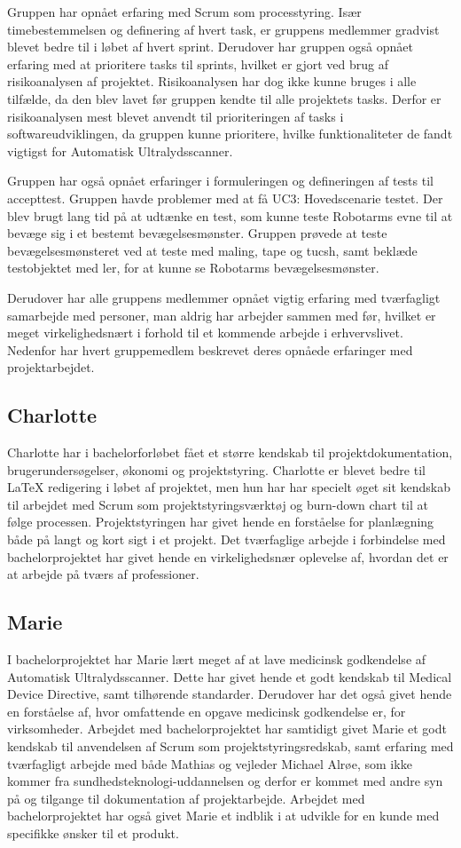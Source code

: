 Gruppen har opnået erfaring med Scrum som processtyring. Især timebestemmelsen og definering af hvert task, er gruppens medlemmer gradvist blevet bedre til i løbet af hvert sprint. Derudover har gruppen også opnået erfaring med at prioritere tasks til sprints, hvilket er gjort ved brug af risikoanalysen af projektet. Risikoanalysen har dog ikke kunne bruges i alle tilfælde, da den blev lavet før gruppen kendte til alle projektets tasks. Derfor er risikoanalysen mest blevet anvendt til prioriteringen af tasks i softwareudviklingen, da gruppen kunne prioritere, hvilke funktionaliteter de fandt vigtigst for Automatisk Ultralydsscanner. 

Gruppen har også opnået erfaringer i formuleringen og defineringen af tests til accepttest. Gruppen havde problemer med at få UC3: Hovedscenarie testet. Der blev brugt lang tid på at udtænke en test, som kunne teste Robotarms evne til at bevæge sig i et bestemt bevægelsesmønster. Gruppen prøvede at teste bevægelsesmønsteret ved at teste med maling, tape og tucsh, samt beklæde testobjektet med ler, for at kunne se Robotarms bevægelsesmønster. 

Derudover har alle gruppens medlemmer opnået vigtig erfaring med tværfagligt samarbejde med personer, man aldrig har arbejder sammen med før, hvilket er meget virkelighedsnært i forhold til et kommende arbejde i erhvervslivet.
Nedenfor har hvert gruppemedlem beskrevet deres opnåede erfaringer med projektarbejdet. 

\subsection{Charlotte}
Charlotte har i bachelorforløbet fået et større kendskab til projektdokumentation, brugerundersøgelser, økonomi og projektstyring. Charlotte er blevet bedre til LaTeX redigering i løbet af projektet, men hun har har specielt øget sit kendskab til arbejdet med Scrum som projektstyringsværktøj og burn-down chart til at følge processen. Projektstyringen har givet hende en forståelse for planlægning både på langt og kort sigt i et projekt. Det tværfaglige arbejde i forbindelse med bachelorprojektet har givet hende en virkelighedsnær oplevelse af, hvordan det er at arbejde på tværs af professioner. 

\subsection{Marie}
I bachelorprojektet har Marie lært meget af at lave medicinsk godkendelse af Automatisk Ultralydsscanner. Dette har givet hende et godt kendskab til Medical Device Directive, samt tilhørende standarder. Derudover har det også givet hende en forståelse af, hvor omfattende en opgave medicinsk godkendelse er, for virksomheder. Arbejdet med bachelorprojektet har samtidigt givet Marie et godt kendskab til anvendelsen af Scrum som projektstyringsredskab, samt erfaring med tværfagligt arbejde med både Mathias og vejleder Michael Alrøe, som ikke kommer fra sundhedsteknologi-uddannelsen og derfor er kommet med andre syn på og tilgange til dokumentation af projektarbejde. Arbejdet med bachelorprojektet har også givet Marie et indblik i at udvikle for en kunde med specifikke ønsker til et produkt. 

